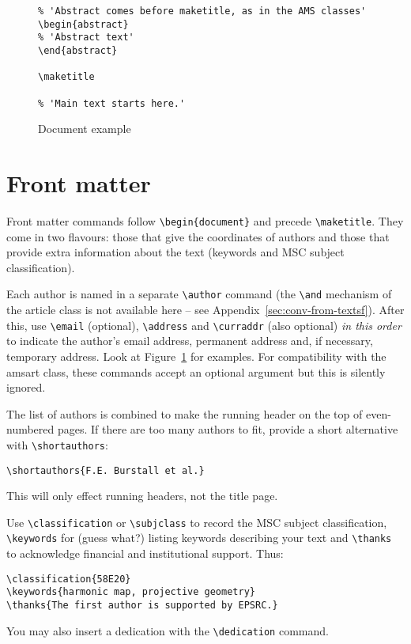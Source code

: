 \documentclass[noams]{compositio}
\newcommand*{\pkg}[1]{{\mdseries\textsf{#1}}}
\begin{document}
\begin{figure}[!t]
\begin{minipage}{5.1in}
\begin{verbatim}
% 'Abstract comes before maketitle, as in the AMS classes'
\begin{abstract}
% 'Abstract text'
\end{abstract}

\maketitle

% 'Main text starts here.'
\end{verbatim}\end{minipage}\vspace*{5mm}
\caption{Document example} \label{fig:ex1}
\end{figure}

\section{Front matter}
\label{sec:front-matter}

Front matter commands follow \verb+\begin{document}+ and precede
\verb+\maketitle+.  They come in two flavours: those that give the
coordinates of authors and those that provide extra information
about the text (keywords and MSC subject classification).

Each author is named in a separate \verb+\author+ command (the
\verb+\and+ mechanism of the \pkg{article} class is not available
here -- see Appendix~\ref{sec:conv-from-textsf}).  After this, use
\verb+\email+ (optional), \verb+\address+ and \verb+\curraddr+
(also optional) \emph{in this order} to indicate the author's
email address, permanent address and, if necessary, temporary
address. Look at Figure~\ref{fig:ex1} for examples. For
compatibility with the \pkg{amsart} class, these commands accept
an optional argument but this is silently ignored.

The list of authors is combined to make the running header on the top
of even-numbered pages.  If there are too many authors to fit,
provide a short alternative with \verb+\shortauthors+:

\verb+\shortauthors{F.E. Burstall et al.}+

\noindent
This will only effect running headers, not the title page.

Use \verb+\classification+ or \verb+\subjclass+ to record the MSC
subject classification, \verb+\keywords+ for (guess what?) listing
keywords describing your text and \verb+\thanks+ to acknowledge
financial and institutional support.  Thus:
\begin{verbatim}
\classification{58E20}
\keywords{harmonic map, projective geometry}
\thanks{The first author is supported by EPSRC.}
\end{verbatim}
You may also insert a dedication with the \verb+\dedication+
command.
\end{document}
